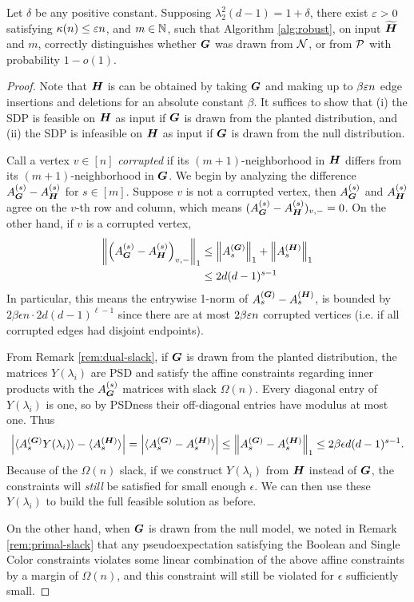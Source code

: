 \begin{theorem}
    Let $\delta$ be any positive constant. Supposing $\lambda^2_2(d-1) = 1+\delta$, there exist $\varepsilon > 0$ satisfying $\kappa(n)\le\varepsilon n$, and $m \in \mathbb{N}$, such that Algorithm \ref{alg:robust}, on input $\widetilde{\boldsymbol{H}}$ and $m$, correctly distinguishes whether $\boldsymbol{G}$ was drawn from $\mathcal{N}$, or from $\mathcal{P}$ with probability $1-o(1)$.
\end{theorem}
\begin{proof}
	Note that $\boldsymbol{H}$ is can be obtained by taking $\boldsymbol{G}$ and making up to $\beta\varepsilon n$ edge insertions and deletions for an absolute constant $\beta$. It suffices to show that (i) the SDP is feasible on $\boldsymbol{H}$ as input if $\boldsymbol{G}$ is drawn from the planted distribution, and (ii) the SDP is infeasible on $\boldsymbol{H}$ as input if $\boldsymbol{G}$ is drawn from the null distribution.

	Call a vertex $v \in [n]$ \emph{corrupted} if its $(m+1)$-neighborhood in $\boldsymbol{H}$ differs from its $(m+1)$-neighborhood in $\boldsymbol{G}$.  We begin by analyzing the difference $A^{(s)}_{\boldsymbol{G}} -A^{(s)}_{\boldsymbol{H}}$ for $s\in[m]$. Suppose $v$ is not a corrupted vertex, then $A^{(s)}_{\boldsymbol{G}}$ and $A^{(s)}_{\boldsymbol{H}}$ agree on the $v$-th row and column, which means $(A^{(s)}_{\boldsymbol{G}}-A^{(s)}_{\boldsymbol{H}})_{v,-} = 0$. On the other hand, if $v$ is a corrupted vertex,
	\begin{align*}
		\left\|\left(A^{(s)}_{\boldsymbol{G}}-A^{(s)}_{\boldsymbol{H}}\right)_{v,-}\right\|_1 &\le \left\|A^{(\boldsymbol{G})}_{s}\right\|_1 + \left\|A^{(\boldsymbol{H})}_{s}\right\|_1\\
		&\le 2d(d-1)^{s-1}
	\end{align*}
	In particular, this means the entrywise 1-norm of $A^{(\boldsymbol{G})}_{s}-A^{(\boldsymbol{H})}_{s}$, is bounded by $2\beta\epsilon n\cdot 2d(d-1)^{\ell-1}$ since there are at most $2\beta\varepsilon n$ corrupted vertices (i.e. if all corrupted edges had disjoint endpoints).
	
	From Remark \ref{rem:dual-slack}, if $\boldsymbol{G}$ is drawn from the planted distribution, the matrices $Y(\lambda_i)$ are PSD and satisfy the affine constraints regarding inner products with the $A^{(s)}_{\boldsymbol{G}}$ matrices with slack $\Omega(n)$. Every diagonal entry of $Y(\lambda_i)$ is one, so by PSDness their off-diagonal entries have modulus at most one. Thus
	$$
        \left|\langle A^{(\boldsymbol{G})}_{s} Y(\lambda_i) \rangle - \langle A^{(\boldsymbol{H})}_{s}\rangle \right| = \left|	\langle A^{(\boldsymbol{G})}_{s} - A^{(\boldsymbol{H})}_{s}\rangle\right| \le \left\|A^{(\boldsymbol{G})}_{s} - A^{(\boldsymbol{H})}_{s}\right\|_1 \le 2\beta\epsilon d(d-1)^{s-1}.
	$$
    Because of the $\Omega(n)$ slack, if we construct $Y(\lambda_i)$ from $\boldsymbol{H}$ instead of $\boldsymbol{G}$, the constraints will \emph{still} be satisfied for small enough $\epsilon$. We can then use these $Y(\lambda_i)$ to build the full feasible solution as before.
    
    On the other hand, when $\boldsymbol{G}$ is drawn from the null model, we noted in Remark \ref{rem:primal-slack} that any pseudoexpectation satisfying the Boolean and Single Color constraints violates some linear combination of the above affine constraints by a margin of $\Omega(n)$, and this constraint will still be violated for $\epsilon$ sufficiently small.
\end{proof}

